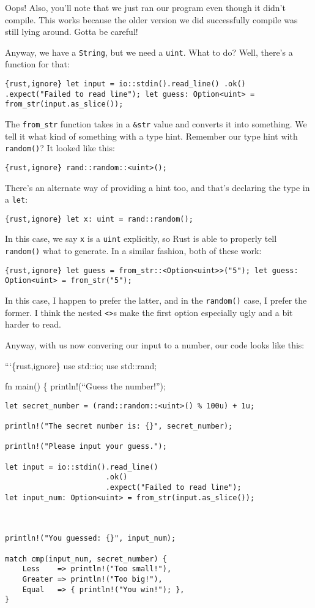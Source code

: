 \documentclass[]{article}
\begin{document}
Oops! Also, you'll note that we just ran our program even though it
didn't compile. This works because the older version we did successfully
compile was still lying around. Gotta be careful!

Anyway, we have a \texttt{String}, but we need a \texttt{uint}. What to
do? Well, there's a function for that:

\texttt{\{rust,ignore\} let input = io::stdin().read\_line()                        .ok()                        .expect("Failed to read line"); let guess: Option\textless{}uint\textgreater{} = from\_str(input.as\_slice());}

The \texttt{from\_str} function takes in a \texttt{\&str} value and
converts it into something. We tell it what kind of something with a
type hint. Remember our type hint with \texttt{random()}? It looked like
this:

\texttt{\{rust,ignore\} rand::random::\textless{}uint\textgreater{}();}

There's an alternate way of providing a hint too, and that's declaring
the type in a \texttt{let}:

\texttt{\{rust,ignore\} let x: uint = rand::random();}

In this case, we say \texttt{x} is a \texttt{uint} explicitly, so Rust
is able to properly tell \texttt{random()} what to generate. In a
similar fashion, both of these work:

\texttt{\{rust,ignore\} let guess = from\_str::\textless{}Option\textless{}uint\textgreater{}\textgreater{}("5"); let guess: Option\textless{}uint\textgreater{} = from\_str("5");}

In this case, I happen to prefer the latter, and in the
\texttt{random()} case, I prefer the former. I think the nested
\texttt{\textless{}\textgreater{}}s make the first option especially
ugly and a bit harder to read.

Anyway, with us now convering our input to a number, our code looks like
this:

```\{rust,ignore\} use std::io; use std::rand;

fn main() \{ println!(``Guess the number!'');

\begin{verbatim}
let secret_number = (rand::random::<uint>() % 100u) + 1u;

println!("The secret number is: {}", secret_number);

println!("Please input your guess.");

let input = io::stdin().read_line()
                       .ok()
                       .expect("Failed to read line");
let input_num: Option<uint> = from_str(input.as_slice());



println!("You guessed: {}", input_num);

match cmp(input_num, secret_number) {
    Less    => println!("Too small!"),
    Greater => println!("Too big!"),
    Equal   => { println!("You win!"); },
}
\end{verbatim}
\end{document}
